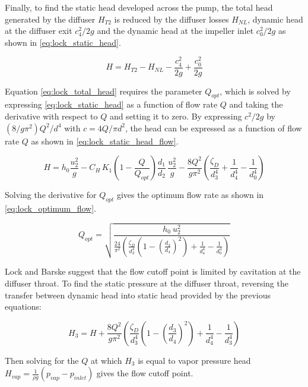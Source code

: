 Finally, to find the static head developed across the pump, the total head generated by the diffuser $H_{T2}$ is reduced by the diffuser losses $H_{NL}$, dynamic head at the diffuser exit $c_4^2/2g$ and the dynamic head at the impeller inlet $c_0^2/2g$ as shown in \cref{eq:lock_static_head}.

\begin{equation}
H = H_{T2} - H_{NL} - \frac{c_4^2}{2g} + \frac{c_0^2}{2g}
\label{eq:lock_static_head}
\end{equation}

Equation \cref{eq:lock_total_head} requires the parameter $Q_{opt}$, which is solved by expressing \cref{eq:lock_static_head} as a function of flow rate $Q$ and taking the derivative with respect to $Q$ and setting it to zero. By expressing $c^2/2g$ by $(8/g\pi^2)Q^2/d^4$ with $c=4Q/\pi d^2$, the head can be expressed as a function of flow rate $Q$ as shown in \cref{eq:lock_static_head_flow}.

\begin{equation}
    H = h_0\frac{u_2^2}{g} - C_H\,K_1\!\left(1-\frac{Q}{Q_{opt}}\right)\!\frac{d_1}{d_2}\,\frac{u_2^2}{g} - \frac{8Q^2}{g\pi^2}\left(\frac{\zeta_{D}}{d_3^4} + \frac{1}{d_4^4} - \frac{1}{d_0^4}\right)
    \label{eq:lock_static_head_flow}
\end{equation}

Solving the derivative for $Q_{opt}$ gives the optimum flow rate as shown in \cref{eq:lock_optimum_flow}.

\begin{equation}
    Q_{opt} = \sqrt{\frac{h_0\ u_2^2}{\frac{24}{\pi^2}\left(\frac{\zeta_{D}}{d_3^4}\left(1-\left(\frac{d_3}{d_4}\right)^2\right) + \frac{1}{d_4^4} - \frac{1}{d_0^4}\right)}}
    \label{eq:lock_optimum_flow}
\end{equation}

Lock and Barske suggest that the flow cutoff point is limited by cavitation at the diffuser throat. To find the static pressure at the diffuser throat, reversing the transfer between dynamic head into static head provided by the previous equations:

\begin{equation}
    H_3 = H + \frac{8Q^2}{g\pi^2}\left(\frac{\zeta_{D}}{d_3^4}\left(1-\left(\frac{d_3}{d_4}\right)^2\right) + \frac{1}{d_4^4} - \frac{1}{d_3^4}\right)
    \label{eq:lock_diffuser_throat}
\end{equation}

Then solving for the $Q$ at which $H_3$ is equal to vapor pressure head $H_{vap}=\frac{1}{\rho g}\left(p_{vap}-p_{inlet}\right)$ gives the flow cutoff point.

